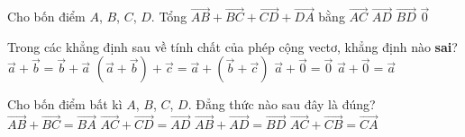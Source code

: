 \begin{ex}%
	Cho bốn điểm $A$, $B$, $C$, $D$. Tổng $\overrightarrow{AB} + \overrightarrow{BC} + \overrightarrow{CD} + \overrightarrow{DA}$ bằng
	\choice
	{$\overrightarrow{AC}$}
	{$\overrightarrow{AD}$}
	{$\overrightarrow{BD}$}
	{\True $\overrightarrow{0}$}
\end{ex}
\begin{ex}%
	Trong các khẳng định sau về tính chất của phép cộng vectơ, khẳng định nào {\bf{sai}}?
	\choice
	{$\overrightarrow{a} + \overrightarrow{b} = \overrightarrow{b} + \overrightarrow{a}$}
	{$\left(\overrightarrow{a} + \overrightarrow{b}\right) + \overrightarrow{c} = \overrightarrow{a} + \left(\overrightarrow{b} + \overrightarrow{c}\right)$}
	{\True $\overrightarrow{a} + \overrightarrow{0} = \overrightarrow{0}$}
	{$\overrightarrow{a} + \overrightarrow{0} = \overrightarrow{a}$}
\end{ex}
\begin{ex}%
	Cho bốn điểm bất kì $A$, $B$, $C$, $D$. Đẳng thức nào sau đây là đúng?
	\choice
	{$\overrightarrow{AB} + \overrightarrow{BC} = \overrightarrow{BA}$}
	{\True $\overrightarrow{AC} + \overrightarrow{CD} = \overrightarrow{AD}$}
	{$\overrightarrow{AB} + \overrightarrow{AD} = \overrightarrow{BD}$}
	{$\overrightarrow{AC} + \overrightarrow{CB} = \overrightarrow{CA}$}
\end{ex}

